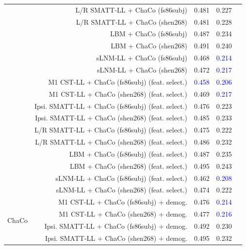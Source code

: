 \documentclass[10pt]{article}
\newcommand{\colorProcessBlue}[1]{\textcolor{ProcessBlue}{#1}}
\newcommand{\colorNavyBlue}[1]{\textcolor{NavyBlue}{#1}}
\newcommand{\colorBlue}[1]{\textcolor{Blue}{#1}}
\begin{document}
\begin{table}[h]
\begin{tabular}{lrrrr}
 & L/R SMATT-LL + ChaCo (fs86subj) & \colorNavyBlue{0.481} & \colorNavyBlue{0.227} \\
 & L/R SMATT-LL + ChaCo (shen268) & \colorNavyBlue{0.481} & \colorNavyBlue{0.228} \\
 & LBM + ChaCo (fs86subj) & \colorNavyBlue{0.487} & \colorProcessBlue{0.234} \\
 & LBM + ChaCo (shen268) & \colorProcessBlue{0.491} & \colorProcessBlue{0.240} \\
 & sLNM-LL + ChaCo (fs86subj) & \colorNavyBlue{0.468} & \colorBlue{0.214} \\
 & sLNM-LL + ChaCo (shen268) & \colorNavyBlue{0.472} & \colorBlue{0.217} \\
 & M1 CST-LL + ChaCo (fs86subj) (feat. select.) & \colorBlue{0.458} & \colorBlue{0.206} \\
 & M1 CST-LL + ChaCo (shen268) (feat. select.) & \colorNavyBlue{0.469} & \colorBlue{0.217} \\
 & Ipsi. SMATT-LL + ChaCo (fs86subj) (feat. select.) & \colorNavyBlue{0.476} & \colorNavyBlue{0.223} \\
 & Ipsi. SMATT-LL + ChaCo (shen268) (feat. select.) & \colorNavyBlue{0.485} & \colorProcessBlue{0.233} \\
 & L/R SMATT-LL + ChaCo (fs86subj) (feat. select.) & \colorNavyBlue{0.475} & \colorNavyBlue{0.222} \\
 & L/R SMATT-LL + ChaCo (shen268) (feat. select.) & \colorNavyBlue{0.486} & \colorProcessBlue{0.232} \\
 & LBM + ChaCo (fs86subj) (feat. select.) & \colorNavyBlue{0.487} & \colorProcessBlue{0.235} \\
 & LBM + ChaCo (shen268) (feat. select.) & \colorProcessBlue{0.495} & \colorProcessBlue{0.243} \\
 & sLNM-LL + ChaCo (fs86subj) (feat. select.) & \colorNavyBlue{0.462} & \colorBlue{0.208} \\
 & sLNM-LL + ChaCo (shen268) (feat. select.) & \colorNavyBlue{0.474} & \colorNavyBlue{0.222} \\
\multirow[t]{20}{*}{ChaCo} & M1 CST-LL + ChaCo (fs86subj) + demog. & \colorNavyBlue{0.476} & \colorBlue{0.214} \\
+ Lesion load & M1 CST-LL + ChaCo (shen268) + demog. & \colorNavyBlue{0.477} & \colorBlue{0.216} \\
+ Demog. & Ipsi. SMATT-LL + ChaCo (fs86subj) + demog. & \colorProcessBlue{0.492} & \colorProcessBlue{0.230} \\
 & Ipsi. SMATT-LL + ChaCo (shen268) + demog. & \colorProcessBlue{0.495} & \colorProcessBlue{0.232} \\

\end{tabular}
\end{table}
\end{document}
